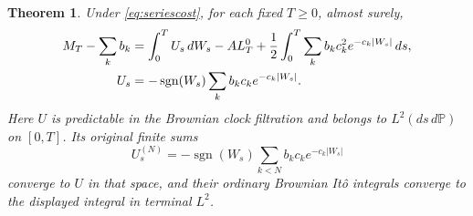 \documentclass[11pt]{article}
\newtheorem{theorem}{Theorem}[section]
\newcommand{\Pp}{\mathbb P}
\begin{document}
\begin{theorem}\label{thm:completedmeans}
Under \eqref{eq:seriescost}, for each fixed $T\geq0$, almost surely,
\begin{align}\label{eq:completedito}
 M_T-\sum_k b_k
 &=\int_0^T U_s\,dW_s-A L_T^0
   +\frac12\int_0^T\sum_k b_kc_k^2e^{-c_k|W_s|}\,ds,\\
 U_s&=-\operatorname{sgn}(W_s)
           \sum_k b_kc_ke^{-c_k|W_s|}.\notag
\end{align}
Here $U$ is predictable in the Brownian clock filtration and belongs
to $L^2(ds\,d\Pp)$ on $[0,T]$. Its original finite sums
\[
 U_s^{(N)}=-\operatorname{sgn}(W_s)
          \sum_{k<N}b_kc_ke^{-c_k|W_s|}
\]
converge to $U$ in that space, and their ordinary Brownian It\^o
integrals converge to the displayed integral in terminal $L^2$.
\end{theorem}
\end{document}
